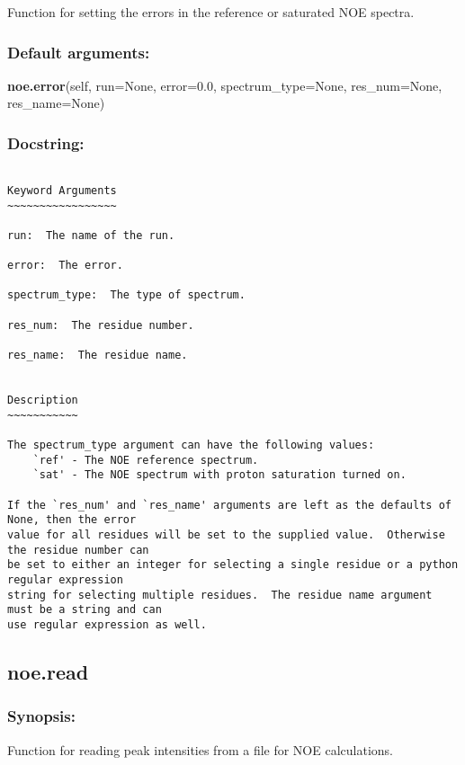 Function for setting the errors in the reference or saturated NOE spectra.

\subsubsection{Default arguments:}

\textsf{\textbf{noe.error}(self, run=None, error=0.0, spectrum\_type=None, res\_num=None, res\_name=None)
}


\subsubsection{Docstring:}

{\scriptsize
\begin{verbatim}

Keyword Arguments
~~~~~~~~~~~~~~~~~

run:  The name of the run.

error:  The error.

spectrum_type:  The type of spectrum.

res_num:  The residue number.

res_name:  The residue name.


Description
~~~~~~~~~~~

The spectrum_type argument can have the following values:
    `ref' - The NOE reference spectrum.
    `sat' - The NOE spectrum with proton saturation turned on.

If the `res_num' and `res_name' arguments are left as the defaults of None, then the error
value for all residues will be set to the supplied value.  Otherwise the residue number can
be set to either an integer for selecting a single residue or a python regular expression
string for selecting multiple residues.  The residue name argument must be a string and can
use regular expression as well.
\end{verbatim}
}



\newpage

\subsection{noe.read}


\subsubsection{Synopsis:}

Function for reading peak intensities from a file for NOE calculations.

